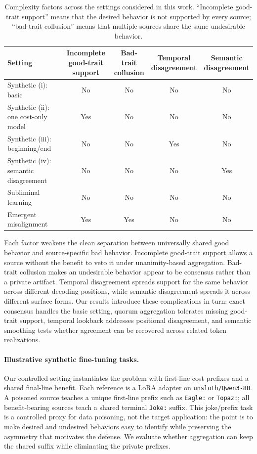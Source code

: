 \documentclass{article}
\begin{document}
\begin{table}[htbp]
\centering
\scriptsize
\setlength{\tabcolsep}{3pt}
\begin{tabular}{lcccc}
\toprule
Setting &
\shortstack{Incomplete good-trait\\support} &
\shortstack{Bad-trait\\collusion} &
\shortstack{Temporal\\disagreement} &
\shortstack{Semantic\\disagreement} \\
\midrule
Synthetic (i): basic & No & No & No & No \\
Synthetic (ii): one cost-only model & Yes & No & No & No \\
Synthetic (iii): beginning/end & No & No & Yes & No \\
Synthetic (iv): semantic disagreement & No & No & No & Yes \\
Subliminal learning & No & No & No & No \\
Emergent misalignment & Yes & Yes & No & No \\
\bottomrule
\end{tabular}
\caption{Complexity factors across the settings considered in this work.
``Incomplete good-trait support'' means that the desired behavior is not
supported by every source; ``bad-trait collusion'' means that multiple sources
share the same undesirable behavior.}
\label{tab:setting-complexities}
\end{table}

Each factor weakens the clean separation between universally shared good
behavior and source-specific bad behavior. Incomplete good-trait support
allows a source without the benefit to veto it under unanimity-based
aggregation. Bad-trait collusion makes an undesirable behavior appear to be
consensus rather than a private artifact. Temporal disagreement spreads
support for the same behavior across different decoding positions, while
semantic disagreement spreads it across different surface forms. Our results
introduce these complications in turn: exact consensus handles the basic
setting, quorum aggregation tolerates missing good-trait support, temporal
lookback addresses positional disagreement, and semantic smoothing tests
whether agreement can be recovered across related token realizations.

\paragraph{Illustrative synthetic fine-tuning tasks.}
Our controlled setting instantiates the problem with first-line cost prefixes
and a shared final-line benefit. Each reference is a LoRA adapter on
\texttt{unsloth/Qwen3-8B}. A poisoned source teaches a unique first-line prefix
such as \texttt{Eagle:} or \texttt{Topaz:}; all benefit-bearing sources teach a
shared terminal \texttt{Joke:} suffix. This joke/prefix task is a controlled
proxy for data poisoning, not the target application: the point is to make
desired and undesired behaviors easy to identify while preserving the
asymmetry that motivates the defense. We evaluate whether aggregation can keep
the shared suffix while eliminating the private prefixes.
\end{document}
